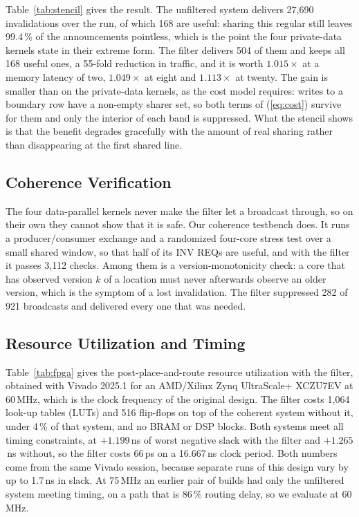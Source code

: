 \documentclass[conference]{IEEEtran}
\begin{document}
Table~\ref{tab:stencil} gives the result. The unfiltered system delivers
27{,}690 invalidations over the run, of which 168 are useful: sharing this
regular still leaves 99.4\,\% of the announcements pointless, which is the
point the four private-data kernels state in their extreme form. The filter
delivers 504 of them and keeps all 168 useful ones, a 55-fold reduction in
traffic, and it is worth $1.015\times$ at a memory latency of two,
$1.049\times$ at eight and $1.113\times$ at twenty. The gain is smaller than
on the private-data kernels, as the cost model requires: writes to a boundary
row have a non-empty sharer set, so both terms of (\ref{eq:cost}) survive for
them and only the interior of each band is suppressed. What the stencil shows
is that the benefit degrades gracefully with the amount of real sharing
rather than disappearing at the first shared line.

\subsection{Coherence Verification}

The four data-parallel kernels never make the filter let a broadcast through,
so on their own they cannot show that it is safe. Our coherence
testbench does. It runs a producer/consumer exchange and a randomized
four-core stress test over a small shared window, so that half of its
INV REQs are useful, and with the filter it passes 3{,}112 checks.
Among them is a version-monotonicity check: a core that has observed version
$k$ of a location must never afterwards observe an older version, which is
the symptom of a lost invalidation. The filter suppressed 282 of 921
broadcasts and delivered every one that was needed.

\subsection{Resource Utilization and Timing}



Table~\ref{tab:fpga} gives the post-place-and-route resource utilization with
the filter, obtained with Vivado 2025.1 for an AMD/Xilinx Zynq UltraScale+
XCZU7EV at 60\,MHz, which is the clock frequency of the original design. The
filter costs 1{,}064 look-up tables (LUTs) and 516 flip-flops on top of the
coherent system without it, under 4\,\% of that system, and no BRAM or DSP
blocks. Both systems meet all timing constraints, at $+1.199$\,ns of worst
negative slack with the filter and $+1.265$\,ns without, so the filter costs
66\,ps on a 16.667\,ns clock period. Both numbers come from the same Vivado
session, because separate runs of this design vary by up to 1.7\,ns in slack.
At 75\,MHz an earlier pair of builds had only the unfiltered system meeting
timing, on a path that is 86\,\% routing delay, so we evaluate at 60\,MHz.
\end{document}
